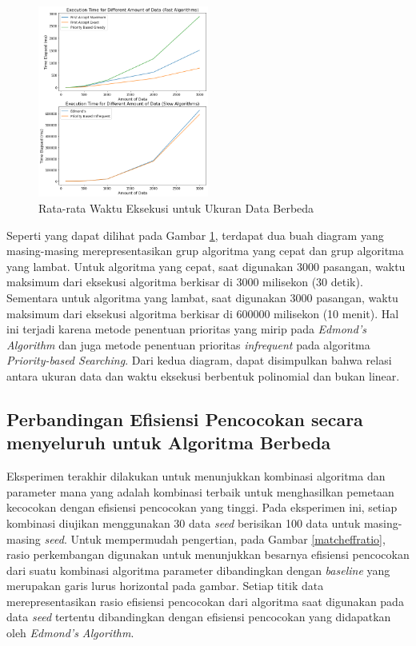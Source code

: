 \documentclass[conference]{IEEEtran}
\begin{document}
\begin{figure}[h]
    \includegraphics[width=0.5\textwidth]{images/execution_time_for_different_amount_of_data.png}
    \caption{Rata-rata Waktu Eksekusi untuk Ukuran Data Berbeda}
    \label{exctimedata}
\end{figure}

Seperti yang dapat dilihat pada Gambar \ref{exctimedata}, terdapat dua buah diagram yang masing-masing merepresentasikan grup
algoritma yang cepat dan grup algoritma yang lambat. Untuk algoritma yang cepat, saat digunakan 3000 pasangan, waktu maksimum
dari eksekusi algoritma berkisar di 3000 milisekon (30 detik). Sementara untuk algoritma yang lambat, saat digunakan 3000 pasangan,
waktu maksimum dari eksekusi algoritma berkisar di 600000 milisekon (10 menit). Hal ini terjadi karena metode penentuan prioritas
yang mirip pada \textit{Edmond's Algorithm} dan juga metode penentuan prioritas \textit{infrequent} pada algoritma
\textit{Priority-based Searching}. Dari kedua diagram, dapat disimpulkan bahwa relasi antara ukuran data dan waktu eksekusi berbentuk
polinomial dan bukan linear.

\subsection{Perbandingan Efisiensi Pencocokan secara menyeluruh untuk Algoritma Berbeda}
Eksperimen terakhir dilakukan untuk menunjukkan kombinasi algoritma dan parameter mana yang adalah kombinasi terbaik untuk menghasilkan
pemetaan kecocokan dengan efisiensi pencocokan yang tinggi. Pada eksperimen ini, setiap kombinasi diujikan menggunakan 30 data \textit{seed}
berisikan 100 data untuk masing-masing \textit{seed}. Untuk mempermudah pengertian, pada Gambar \ref{matcheffratio}, rasio perkembangan
digunakan untuk menunjukkan besarnya efisiensi pencocokan dari suatu kombinasi algoritma parameter dibandingkan dengan \textit{baseline}
yang merupakan garis lurus horizontal pada gambar. Setiap titik data merepresentasikan rasio efisiensi pencocokan dari algoritma saat
digunakan pada data \textit{seed} tertentu dibandingkan dengan efisiensi pencocokan yang didapatkan oleh \textit{Edmond's Algorithm}.
\end{document}
